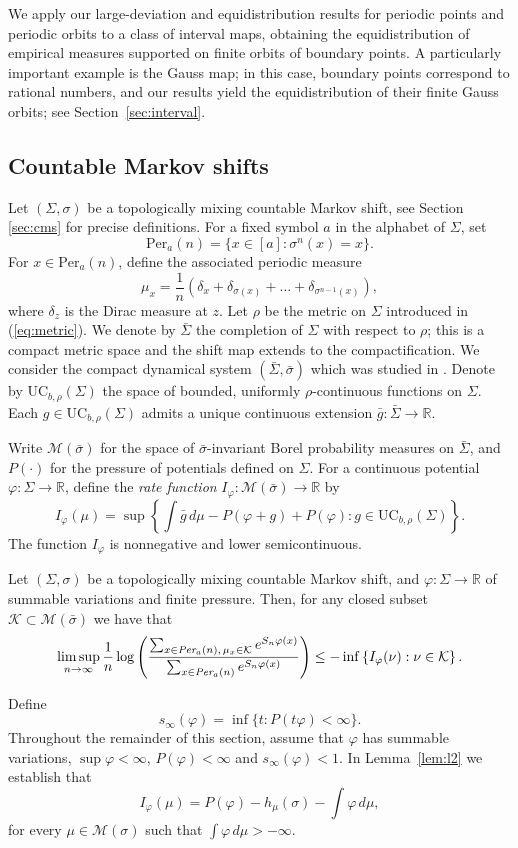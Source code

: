 \documentclass[letterpaper,11pt]{amsart}
\numberwithin{equation}{section}     %
\newcommand{\M}{\mathcal{M}}
\newcommand{\R}{\mathbb{R}}
\def\phi{\varphi}
\def\R{{\mathbb R}}
\def\M{{\mathcal M}}
\def\M{\mathcal{M}}
\begin{document}
We apply our large-deviation and equidistribution results for periodic points and periodic orbits to a class of interval maps, obtaining the equidistribution of empirical measures supported on finite orbits of boundary points. A particularly important example is the Gauss map; in this case, boundary points correspond to rational numbers, and our results yield the equidistribution of their finite Gauss orbits; see Section~\ref{sec:interval}.


\subsection{Countable Markov shifts} 
Let $(\Sigma,\sigma)$ be a topologically mixing countable Markov shift, see Section \ref{sec:cms} for precise definitions. For a fixed symbol $a$ in the alphabet of $\Sigma$, set
\[
\text{Per}_a(n)=\{x\in [a] : \sigma^n(x)=x\}.
\]
For $x\in\text{Per}_a(n)$, define the associated periodic measure
\[
\mu_x= \frac{1}{n} \left(\delta_x+\delta_{\sigma(x)}+\ldots+\delta_{\sigma^{n-1}(x)} \right),
\]
where $\delta_z$ is the Dirac measure at ${z}$. Let $\rho$ be the metric on $\Sigma$ introduced in (\ref{eq:metric}). We denote by $\bar\Sigma$ the completion of $\Sigma$ with respect to $\rho$; this is a compact metric space and the shift map extends to the compactification. We consider the compact dynamical system $(\bar\Sigma,\bar\sigma)$ which was studied in \cite{iv2}. Denote by $\text{UC}_{b,\rho}(\Sigma)$ the space of bounded, uniformly $\rho$-continuous functions on $\Sigma$. Each $g\in\text{UC}_{b,\rho}(\Sigma)$ admits a unique continuous extension $\bar g:\bar\Sigma\to\R$.

Write $\M(\bar\sigma)$ for the space of $\bar\sigma$-invariant Borel probability measures on $\bar\Sigma$, and $P(\cdot)$ for the pressure of potentials defined on $\Sigma$. For a continuous potential $\phi:\Sigma\to\R$, define the \emph{rate function} $I_\phi:\M(\bar\sigma)\to\R$ by
\[
I_\phi(\mu)=\sup\left\{\int \bar g\, d\mu - P(\phi+g) + P(\phi) : g\in \text{UC}_{b,\rho}(\Sigma)\right\}.
\]
The function $I_\phi$ is nonnegative and lower semicontinuous. 

\begin{theorem}\label{thm_ldp}
Let $(\Sigma,\sigma)$ be  a topologically mixing countable Markov shift, and  $\phi:\Sigma\to\R$ of summable variations and finite pressure. Then, for any closed subset $\mathcal{K}\subset\M(\bar\sigma)$ we have that
\[
\limsup_{n \to \infty} \frac{1}{n} \log \left(\frac{\sum_{x\in \emph{Per}_a(n),\, \mu_x\in \mathcal{K}} e^{S_n\phi(x)}}{\sum_{x\in \emph{Per}_a(n)} e^{S_n\phi(x)}}\right)
\leq  - \inf \left\{I_\phi(\nu) : \nu \in \mathcal{K} \right\}.
\]
\end{theorem}
Define
\[
s_\infty(\phi)=\inf\{t : P(t\phi)<\infty\}.
\]
Throughout the remainder of this section, assume that $\phi$ has summable variations, $\sup\phi<\infty$, $P(\phi)<\infty$ and $s_\infty(\phi)<1$. In Lemma~\ref{lem:l2} we establish that
\[
I_\phi(\mu)=P(\phi)-h_\mu(\sigma)-\int \phi\, d\mu,
\]
for every $\mu\in\M(\sigma)$ such that $\int \phi\, d\mu>-\infty$.
\end{document}
